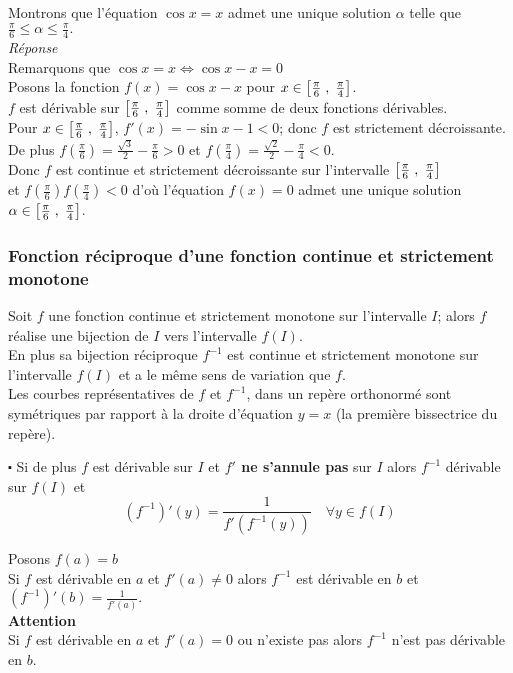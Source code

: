 \begin{example}
Montrons  que l'équation $ \cos x= x $ admet une unique solution $ \alpha$ telle que \\   $ \frac{\pi}{6} \leq \alpha \leq\frac{\pi}{4}.$ \\
\emph{Réponse}\\
Remarquons que  $ \cos x= x  \Leftrightarrow \cos x- x=0$\\
Posons la fonction $ f(x)= \cos x- x$ pour $ x\in \left[\frac{\pi}{6}\;,\; \frac{\pi}{4}\right] $.\\
$ f $ est dérivable sur $\left[\frac{\pi}{6}\;,\; \frac{\pi}{4}\right] $ comme somme de deux fonctions dérivables. \\
Pour $ x\in \left[\frac{\pi}{6}\;,\; \frac{\pi}{4}\right] $, $ f'(x)=-\sin x-1< 0 $; donc $ f $ est strictement décroissante.\\
De plus $ f(\frac{\pi}{6})=\frac{\sqrt{3}}{2} -\frac{\pi}{6 }> 0$  et $ f(\frac{\pi}{4})=\frac{\sqrt{2}}{2} -\frac{\pi}{4 }< 0$.\\
 Donc $ f $ est continue et strictement décroissante sur  l'intervalle $ \left[\frac{\pi}{6 }\;,\; \frac{\pi}{4}\right] $ \\et $ f(\frac{\pi}{6})f(\frac{\pi}{4}) < 0 $ 
d'où l'équation $ f(x)=0 $ admet une  unique  solution $ \alpha \in \left[\frac{\pi}{6}\;,\; \frac{\pi}{4}\right] $.


\end{example}

\subsubsection*{Fonction réciproque d'une fonction continue et strictement monotone} 

\begin{theorem}
Soit $ f $ une fonction continue et strictement monotone  sur  l'intervalle $I$; alors $ f $ réalise une bijection de $ I $ vers l'intervalle $ f(I)$.\\
En plus sa bijection réciproque $ f^{-1} $ est continue et strictement monotone  sur  l'intervalle $f(I)$ et a le même sens de variation que $ f. $\\
Les courbes représentatives de $f $  et $f^{-1} $, dans un repère orthonormé sont symétriques par rapport  à la droite d'équation $ y=x $ (la première  bissectrice  du repère).
\end{theorem}



$ \centerdot $ Si de plus $ f $ est dérivable sur $ I $ et \textbf{\color{magenta} $ f'$ ne s'annule pas} sur  $ I $ alors $ f^{-1} $ dérivable sur $ f(I) $ et
 \[ (f^{-1})'(y)=\frac{1}{f'(f^{-1}(y))}\quad \forall y\in f(I)\]
\begin{remark}
Posons $ f(a)=b $ \\
Si $ f $ est dérivable en $ a $ et $ f'(a)\neq 0 $ alors $ f^{-1} $ est dérivable en $ b $ et $(f^{-1})'(b)=\frac{1}{f'(a)}.  $\\
\textbf{\color{red}Attention}\\
Si $ f $ est dérivable en $ a $ et \colorbox{magenta!20!} {$ f'(a)= 0 $ ou n'existe pas} alors $ f^{-1} $ n'est pas  dérivable en $ b. $
\end{remark}

